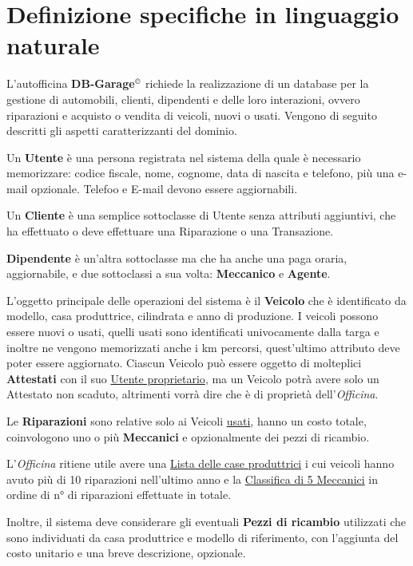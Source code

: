 \documentclass[a4paper,12pt]{report}
\begin{document}
\section{Definizione specifiche in linguaggio naturale}
L'autofficina \textbf{DB-Garage}$^{\copyright}$ richiede la realizzazione di un database per la gestione di automobili,
%
clienti, dipendenti e delle loro interazioni, ovvero riparazioni e acquisto o vendita di veicoli, nuovi o usati. Vengono di seguito 
%
descritti gli aspetti caratterizzanti del dominio.

Un \textbf{Utente} è una persona registrata nel sistema della quale è necessario memorizzare: codice fiscale, nome, cognome,
%
data di nascita e telefono, più una e-mail opzionale. Telefoo e E-mail devono essere aggiornabili.

Un \textbf{Cliente} è una semplice sottoclasse di Utente senza attributi aggiuntivi, che ha effettuato o deve effettuare 
%
una Riparazione o una Transazione.

\textbf{Dipendente} è un'altra sottoclasse ma che ha anche una paga oraria, aggiornabile, e due sottoclassi a sua volta: \textbf{Meccanico} e \textbf{Agente}.

L'oggetto principale delle operazioni del sistema è il \textbf{Veicolo} che è identificato da modello, casa produttrice, cilindrata e anno di produzione.
%
I veicoli possono essere nuovi o usati, quelli usati sono identificati univocamente dalla targa e inoltre ne vengono 
%
memorizzati anche i km percorsi, quest'ultimo attributo deve poter essere aggiornato.
%
Ciascun Veicolo può essere oggetto di molteplici \textbf{Attestati} con il suo \underline{Utente proprietario}, 
%
ma un Veicolo potrà avere solo un Attestato non scaduto, altrimenti vorrà dire che è di proprietà dell'\textit{Officina}.

Le \textbf{Riparazioni} sono relative solo ai Veicoli \underline{usati}, hanno un costo totale, coinvologono uno o più 
%
\textbf{Meccanici} e opzionalmente dei pezzi di ricambio.

L'\textit{Officina} ritiene utile avere una \underline{Lista delle case produttrici} i cui veicoli hanno avuto più di 10 riparazioni
%
nell'ultimo anno e la \underline{Classifica di 5 Meccanici} in ordine di n° di riparazioni effettuate in totale.

Inoltre, il sistema deve considerare gli eventuali \textbf{Pezzi di ricambio} utilizzati che sono individuati da 
%
casa produttrice e modello di riferimento, con l'aggiunta del costo unitario e una breve descrizione, opzionale.
\end{document}
